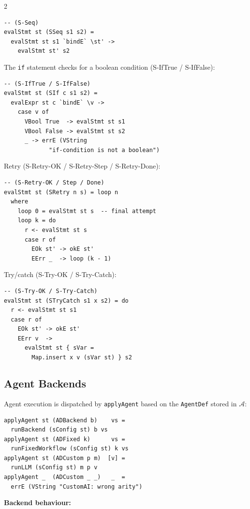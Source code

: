 \documentclass[10pt]{article}
\newcommand{\A}{\mathcal{A}}
\begin{document}
\begin{multicols}{2}
\begin{lstlisting}[style=hs]
-- (S-Seq)
evalStmt st (SSeq s1 s2) =
  evalStmt st s1 `bindE` \st' ->
    evalStmt st' s2
\end{lstlisting}

The \texttt{if} statement checks for a boolean condition (S-IfTrue /
S-IfFalse):

\begin{lstlisting}[style=hs]
-- (S-IfTrue / S-IfFalse)
evalStmt st (SIf c s1 s2) =
  evalExpr st c `bindE` \v ->
    case v of
      VBool True  -> evalStmt st s1
      VBool False -> evalStmt st s2
      _ -> errE (VString
             "if-condition is not a boolean")
\end{lstlisting}

Retry (S-Retry-OK / S-Retry-Step / S-Retry-Done):

\begin{lstlisting}[style=hs]
-- (S-Retry-OK / Step / Done)
evalStmt st (SRetry n s) = loop n
  where
    loop 0 = evalStmt st s  -- final attempt
    loop k = do
      r <- evalStmt st s
      case r of
        EOk st' -> okE st'
        EErr _  -> loop (k - 1)
\end{lstlisting}

Try/catch (S-Try-OK / S-Try-Catch):

\begin{lstlisting}[style=hs]
-- (S-Try-OK / S-Try-Catch)
evalStmt st (STryCatch s1 x s2) = do
  r <- evalStmt st s1
  case r of
    EOk st' -> okE st'
    EErr v  ->
      evalStmt st { sVar =
        Map.insert x v (sVar st) } s2
\end{lstlisting}

\subsection{Agent Backends}

Agent execution is dispatched by \texttt{applyAgent} based on the
\texttt{AgentDef} stored in $\A$:

\begin{lstlisting}[style=hs]
applyAgent st (ADBackend b)    vs =
  runBackend (sConfig st) b vs
applyAgent st (ADFixed k)      vs =
  runFixedWorkflow (sConfig st) k vs
applyAgent st (ADCustom p m)  [v] =
  runLLM (sConfig st) m p v
applyAgent _  (ADCustom _ _)   _  =
  errE (VString "CustomAI: wrong arity")
\end{lstlisting}

\noindent\textbf{Backend behaviour:}


\end{multicols}
\end{document}
